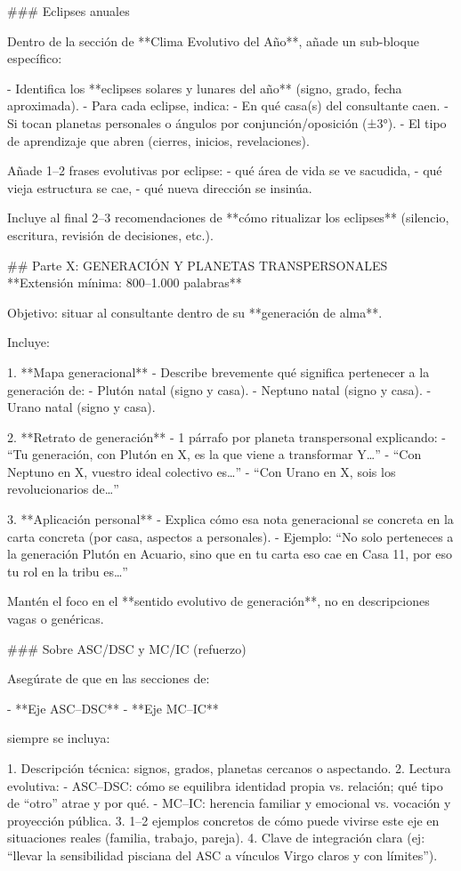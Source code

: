 ### Eclipses anuales

Dentro de la sección de **Clima Evolutivo del Año**, añade un sub-bloque específico:

- Identifica los **eclipses solares y lunares del año** (signo, grado, fecha aproximada).  
- Para cada eclipse, indica:
  - En qué casa(s) del consultante caen.  
  - Si tocan planetas personales o ángulos por conjunción/oposición (±3°).  
  - El tipo de aprendizaje que abren (cierres, inicios, revelaciones).

Añade 1–2 frases evolutivas por eclipse:  
- qué área de vida se ve sacudida,  
- qué vieja estructura se cae,  
- qué nueva dirección se insinúa.

Incluye al final 2–3 recomendaciones de **cómo ritualizar los eclipses** (silencio, escritura, revisión de decisiones, etc.).

## Parte X: GENERACIÓN Y PLANETAS TRANSPERSONALES  
**Extensión mínima: 800–1.000 palabras**

Objetivo: situar al consultante dentro de su **generación de alma**.

Incluye:

1. **Mapa generacional**  
   - Describe brevemente qué significa pertenecer a la generación de:  
     - Plutón natal (signo y casa).  
     - Neptuno natal (signo y casa).  
     - Urano natal (signo y casa).  

2. **Retrato de generación**  
   - 1 párrafo por planeta transpersonal explicando:  
     - “Tu generación, con Plutón en X, es la que viene a transformar Y…”  
     - “Con Neptuno en X, vuestro ideal colectivo es…”  
     - “Con Urano en X, sois los revolucionarios de…”

3. **Aplicación personal**  
   - Explica cómo esa nota generacional se concreta en la carta concreta (por casa, aspectos a personales).  
   - Ejemplo: “No solo perteneces a la generación Plutón en Acuario, sino que en tu carta eso cae en Casa 11, por eso tu rol en la tribu es…”

Mantén el foco en el **sentido evolutivo de generación**, no en descripciones vagas o genéricas.

### Sobre ASC/DSC y MC/IC (refuerzo)

Asegúrate de que en las secciones de:

- **Eje ASC–DSC**  
- **Eje MC–IC**

siempre se incluya:

1. Descripción técnica: signos, grados, planetas cercanos o aspectando.  
2. Lectura evolutiva:
   - ASC–DSC: cómo se equilibra identidad propia vs. relación; qué tipo de “otro” atrae y por qué.  
   - MC–IC: herencia familiar y emocional vs. vocación y proyección pública.  
3. 1–2 ejemplos concretos de cómo puede vivirse este eje en situaciones reales (familia, trabajo, pareja).  
4. Clave de integración clara (ej: “llevar la sensibilidad pisciana del ASC a vínculos Virgo claros y con límites”).


